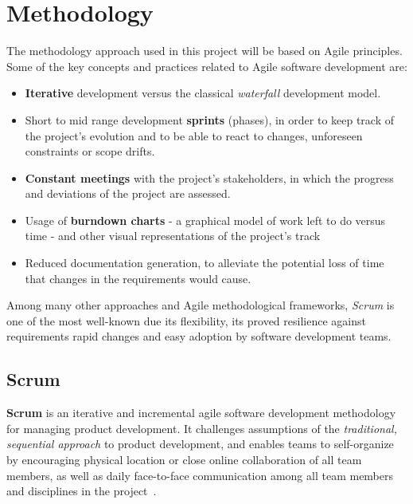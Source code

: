 \section{Methodology}
\label{Management:Methodology}

The methodology approach used in this project will be based on Agile principles. Some of the key concepts and practices related to Agile software development are:

\begin{itemize}
	\item \textbf{Iterative} development versus the classical \textit{waterfall} development model.
	\item Short to mid range development \textbf{sprints} (phases), in order to keep track of the project’s evolution and to be able to react to changes, unforeseen constraints or scope drifts.
	\item \textbf{Constant meetings} with the project’s stakeholders, in which the progress and deviations of the project are assessed.
	\item Usage of \textbf{burndown charts} - a graphical model of work left to do versus time - and other visual representations of the project's track
	\item Reduced documentation generation, to alleviate the potential loss of time that changes in the requirements would cause.
\end{itemize}

Among many other approaches and Agile methodological frameworks, \textit{Scrum} is one of the most well-known due its flexibility, its proved resilience against requirements rapid changes and easy adoption by software development teams.

\subsection{Scrum}

\textbf{Scrum} is an iterative and incremental agile software development methodology for managing product development. It challenges assumptions of the \textit{traditional, sequential approach} to product development, and enables teams to self-organize by encouraging physical location or close online collaboration of all team members, as well as daily face-to-face communication among all team members and disciplines in the project~\citep{web:Wiki:Scrum}.


